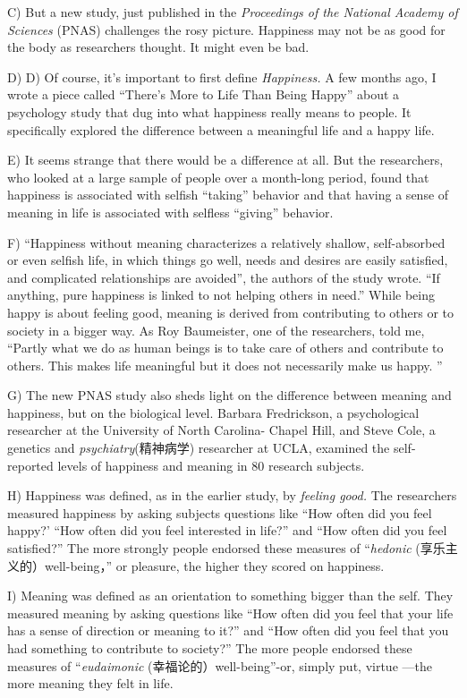 \documentclass[UTF8,11pt]{ctexart}
\begin{document}
C) But a new study, just published in the\textit{ Proceedings of the National Academy of Sciences} (PNAS) challenges the rosy picture. Happiness may not be as good for the body as researchers thought. It might even be bad.


D) D) Of course, it’s important to first define\textit{ Happiness.} A few months ago, I wrote a piece called “There’s More to Life Than Being Happy” about a psychology study that dug into what happiness really means to people. It specifically explored the difference between a meaningful life and a happy life.


E) It seems strange that there would be a difference at all. But the researchers, who looked at a large sample of people over a month-long period, found that happiness is associated with selfish “taking” behavior and that having a sense of meaning in life is associated with selfless “giving” behavior.


F) “Happiness without meaning characterizes a relatively shallow, self-absorbed or even selfish life, in which things go well, needs and desires are easily satisfied, and complicated relationships are avoided”, the authors of the study wrote. “If anything, pure happiness is linked to not helping others in need.” While being happy is about feeling good, meaning is derived from contributing to others or to society in a bigger way. As Roy Baumeister, one of the researchers, told me, “Partly what we do as human beings is to take care of others and contribute to others. This makes life meaningful but it does not necessarily make us happy. ”


G) The new PNAS study also sheds light on the difference between meaning and happiness, but on the biological level. Barbara Fredrickson, a psychological researcher at the University of North Carolina- Chapel Hill, and Steve Cole, a genetics and \textit{psychiatry}(精神病学) researcher at UCLA, examined the self-reported levels of happiness and meaning in 80 research subjects.


H) Happiness was defined, as in the earlier study, by\textit{ feeling good.} The researchers measured happiness by asking subjects questions like “How often did you feel happy?' “How often did you feel interested in life?” and “How often did you feel satisfied?” The more strongly people endorsed these measures of “\textit{hedonic} (享乐主义的）well-being，” or pleasure, the higher they scored on happiness.


I) Meaning was defined as an orientation to something bigger than the self. They measured meaning by asking questions like “How often did you feel that your life has a sense of direction or meaning to it?” and “How often did you feel that you had something to contribute to society?” The more people endorsed these measures of “\textit{eudaimonic} (幸福论的）well-being”-or, simply put, virtue —the more meaning they felt in life.
\end{document}
